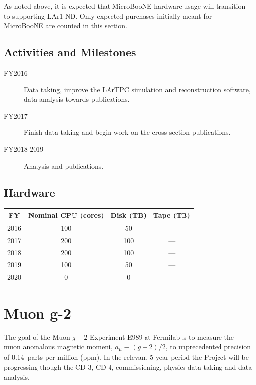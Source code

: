 \documentclass[pdftex,12pt,letter]{article}
\begin{document}
As noted above, it is expected that MicroBooNE hardware usage will
transition to supporting LAr1-ND.
Only expected purchases initially meant for MicroBooNE are counted in
this section.


\subsection{Activities and Milestones}

\begin{description}
\item[FY2016] Data taking, improve the LArTPC simulation and reconstruction software, data analysis towards publications.
\item[FY2017] Finish data taking and begin work on the cross section publications.
\item[FY2018-2019] Analysis and publications.
\end{description}

\subsection{Hardware}
\begin{table}[tbh]
\centering
\begin{tabular}{|c|c|c|c|}
\hline
FY & Nominal CPU (cores) & Disk (TB) & Tape (TB) \\
\hline
2016 &  100  & 50 & --- \\
\hline
2017 &  200 & 100  & ---  \\
\hline
2018 &  200 & 100  & --- \\
\hline
2019  & 100 & 50 & ---  \\
\hline
2020 &  0  & 0 & --- \\
\hline
\end{tabular}
\end{table}


\pagebreak
\section{Muon g-2}

The goal of the Muon $g-2$ Experiment E989 at Fermilab is to measure
the muon anomalous magnetic moment, $a_\mu \equiv (g-2)/2$, to
unprecedented precision of 0.14~parts per million (ppm).
In the relevant 5 year period the Project will be progressing though
the CD-3, CD-4, commissioning, physics data taking and data analysis.  
\end{document}
